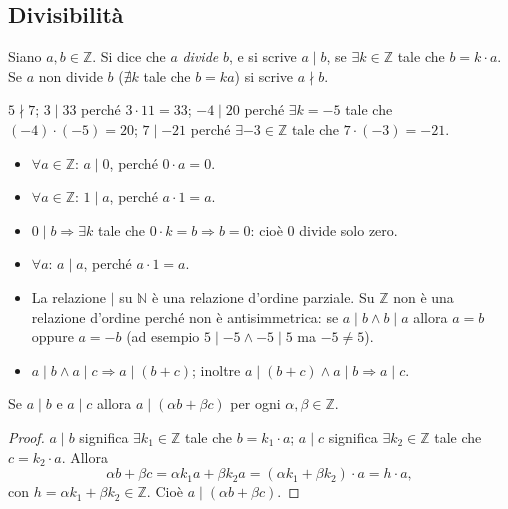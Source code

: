 \documentclass[11pt,a4paper]{article}
\begin{document}
\subsection{Divisibilità}

\begin{definizione}
Siano $a, b \in \mathbb{Z}$. Si dice che $a$ \emph{divide} $b$, e si scrive $a \mid b$, se $\exists k \in \mathbb{Z}$ tale che $b = k\cdot a$. Se $a$ non divide $b$ ($\nexists k$ tale che $b = ka$) si scrive $a \nmid b$.
\end{definizione}

\begin{esempio}
$5 \nmid 7$; \quad $3 \mid 33$ perché $3\cdot 11 = 33$; \quad $-4 \mid 20$ perché $\exists k = -5$ tale che $(-4)\cdot(-5) = 20$; \quad $7 \mid -21$ perché $\exists -3 \in \mathbb{Z}$ tale che $7\cdot(-3) = -21$.
\end{esempio}

\begin{osservazione}
\begin{itemize}
  \item $\forall a \in \mathbb{Z}$: $a \mid 0$, perché $0\cdot a = 0$.
  \item $\forall a \in \mathbb{Z}$: $1 \mid a$, perché $a\cdot 1 = a$.
  \item $0 \mid b \Rightarrow \exists k$ tale che $0\cdot k = b \Rightarrow b = 0$: cioè $0$ divide solo zero.
  \item $\forall a$: $a \mid a$, perché $a\cdot 1 = a$.
  \item La relazione $\mid$ su $\mathbb{N}$ è una relazione d'ordine parziale. Su $\mathbb{Z}$ non è una relazione d'ordine perché non è antisimmetrica: se $a \mid b \wedge b \mid a$ allora $a = b$ oppure $a = -b$ (ad esempio $5 \mid -5 \wedge -5 \mid 5$ ma $-5 \neq 5$).
  \item $a \mid b \wedge a \mid c \Rightarrow a \mid (b + c)$; inoltre $a \mid (b + c) \wedge a \mid b \Rightarrow a \mid c$.
\end{itemize}
\end{osservazione}

\begin{proposizione}[Lemma]
Se $a \mid b$ e $a \mid c$ allora $a \mid (\alpha b + \beta c)$ per ogni $\alpha, \beta \in \mathbb{Z}$.
\end{proposizione}

\begin{proof}
$a \mid b$ significa $\exists k_1 \in \mathbb{Z}$ tale che $b = k_1\cdot a$; $a \mid c$ significa $\exists k_2 \in \mathbb{Z}$ tale che $c = k_2\cdot a$. Allora
\[
  \alpha b + \beta c = \alpha k_1 a + \beta k_2 a = (\alpha k_1 + \beta k_2)\cdot a = h\cdot a ,
\]
con $h = \alpha k_1 + \beta k_2 \in \mathbb{Z}$. Cioè $a \mid (\alpha b + \beta c)$.
\end{proof}
\end{document}
